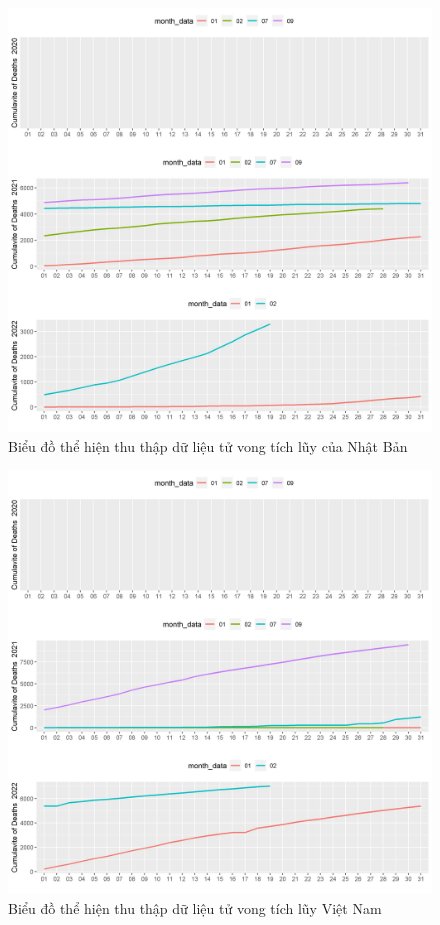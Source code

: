 \documentclass[a4paper]{article}
\theoremstyle{definition}
\begin{document}
\begin{enumerate}[i)]
\begin{enumerate}[1)]
\begin{figure}[htp]
		    \includegraphics[scale = 0.7]{Images/V/v8 Japan .jpeg}
		    \caption{Biểu đồ thể hiện thu thập dữ liệu tử vong tích lũy của Nhật Bản}
		    \label{fig:my_label}
		\end{figure}
		\begin{figure}[htp]
		    \centering
		    \includegraphics[scale = 0.7]{Images/V/v8 Vietnam .jpeg}
		    \caption{Biểu đồ thể hiện thu thập dữ liệu tử vong tích lũy Việt Nam}
		    \label{fig:my_label}
		 \end{figure}
		 \newpage
\end{enumerate}


\end{enumerate}
\end{document}

